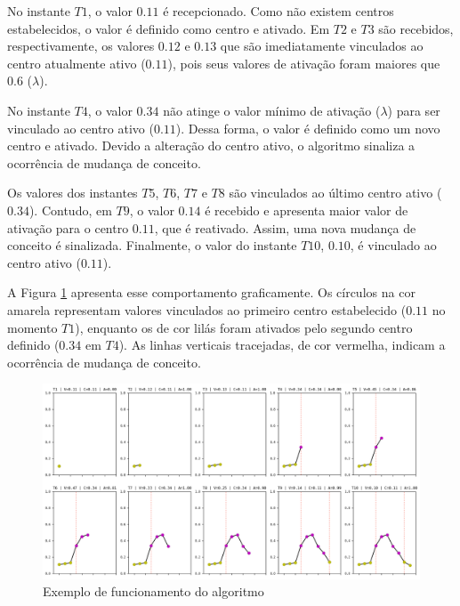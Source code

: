 \documentclass[msc, classic, a4paper]{ufbathesis}
\begin{document}
No instante $T1$, o valor $0.11$ é recepcionado. Como não existem centros estabelecidos, o valor é definido como centro e ativado.
Em $T2$ e $T3$ são recebidos, respectivamente, os valores $0.12$ e $0.13$ que são imediatamente vinculados ao centro atualmente ativo ($0.11$), pois seus valores de ativação foram maiores que $0.6$ ($\lambda$).

No instante $T4$, o valor $0.34$ não atinge o valor mínimo de ativação (\textit{$\lambda$}) para ser vinculado ao centro ativo ($0.11$).
Dessa forma, o valor é definido como um novo centro e ativado.
Devido a alteração do centro ativo, o algoritmo sinaliza a ocorrência de mudança de conceito.

Os valores dos instantes $T5$, $T6$, $T7$ e $T8$ são vinculados ao último centro ativo ($0.34$).
Contudo, em $T9$, o valor $0.14$ é recebido e apresenta maior valor de ativação para o centro $0.11$, que é reativado.
Assim, uma nova mudança de conceito é sinalizada.
Finalmente, o valor do instante $T10$, $0.10$, é vinculado ao centro ativo ($0.11$).

A Figura \ref{fig:funcionamento_algoritmo} apresenta esse comportamento graficamente.
Os círculos na cor amarela representam valores vinculados ao primeiro centro estabelecido ($0.11$ no momento $T1$),
enquanto os de cor lilás foram ativados pelo segundo centro definido ($0.34$ em $T4$).
As linhas verticais tracejadas, de cor vermelha, indicam a ocorrência de mudança de conceito.

\begin{figure}[H]
\begin{center}
    \includegraphics[width=\textwidth]{imagens/funcionamento_algoritmo.png}
    \caption{Exemplo de funcionamento do algoritmo}
    \label{fig:funcionamento_algoritmo}
\end{center}
\end{figure}
\end{document}
